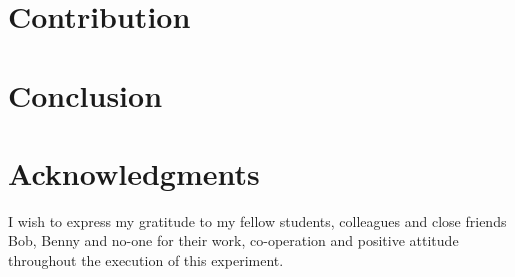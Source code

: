 \documentclass[fleqn,10pt]{SelfArx} %
\newlength{\tocsep}
\begin{document}
\section{Contribution}
\label{sec:contribution}

\section{Conclusion}
\label{sec:conclusion}

\section*{Acknowledgments} %
\label{sec:acknowledgments}
I wish to express my gratitude to my fellow students, colleagues and close friends Bob, Benny and no-one for their work, co-operation and positive attitude throughout the execution of this experiment.



\end{document}
